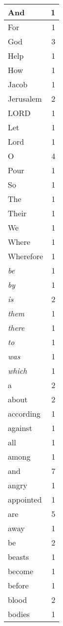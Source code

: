 \begin{center}
\begin{longtable}{l|r}
\hline \hline
\endlastfoot
And & 1 \\ \hline
For & 1 \\ \hline
God & 3 \\ \hline
Help & 1 \\ \hline
How & 1 \\ \hline
Jacob & 1 \\ \hline
Jerusalem & 2 \\ \hline
LORD & 1 \\ \hline
Let & 1 \\ \hline
Lord & 1 \\ \hline
O & 4 \\ \hline
Pour & 1 \\ \hline
So & 1 \\ \hline
The & 1 \\ \hline
Their & 1 \\ \hline
We & 1 \\ \hline
Where & 1 \\ \hline
Wherefore & 1 \\ \hline
\emph{be} & 1 \\ \hline
\emph{by} & 1 \\ \hline
\emph{is} & 2 \\ \hline
\emph{them} & 1 \\ \hline
\emph{there} & 1 \\ \hline
\emph{to} & 1 \\ \hline
\emph{was} & 1 \\ \hline
\emph{which} & 1 \\ \hline
a & 2 \\ \hline
about & 2 \\ \hline
according & 1 \\ \hline
against & 1 \\ \hline
all & 1 \\ \hline
among & 1 \\ \hline
and & 7 \\ \hline
angry & 1 \\ \hline
appointed & 1 \\ \hline
are & 5 \\ \hline
away & 1 \\ \hline
be & 2 \\ \hline
beasts & 1 \\ \hline
become & 1 \\ \hline
before & 1 \\ \hline
blood & 2 \\ \hline
bodies & 1 \\ \hline

\end{longtable}
\end{center}
